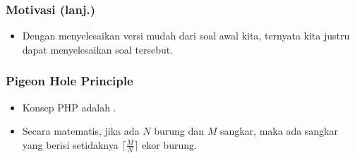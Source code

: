 \begin{frame}
\frametitle{Motivasi (lanj.)}
\begin{itemize}
  \item Dengan menyelesaikan versi mudah dari soal awal kita, ternyata kita justru dapat menyelesaikan soal tersebut.
\end{itemize}
\end{frame}

\begin{frame}
\frametitle{Pigeon Hole Principle}
\begin{itemize}
  \item Konsep PHP adalah .
  \item Secara matematis, jika ada $N$ burung dan $M$ sangkar, maka ada sangkar yang berisi setidaknya $\big\lceil \frac{M}{N} \big\rceil$ ekor burung.
\end{itemize}
\end{frame}


